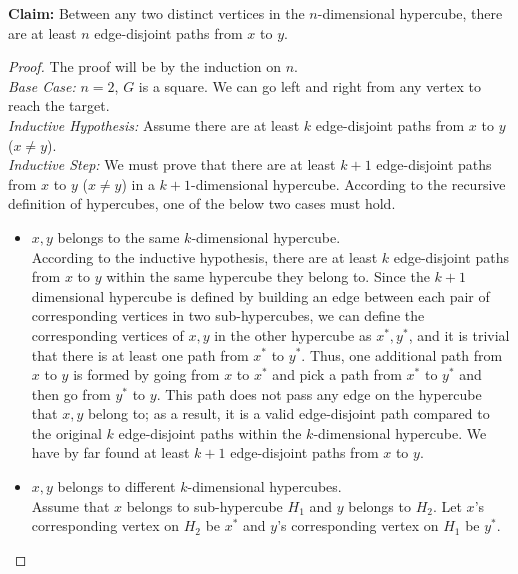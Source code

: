 \documentclass[11pt]{article}
\begin{document}
\newpage
{}

\begin{Answer}
    \textbf{Claim:} Between any two distinct vertices in the $n$-dimensional hypercube, there are at least $n$ 
    edge-disjoint paths from $x$ to $y$.
    \begin{proof}
        The proof will be by the induction on $n$. \\
        \emph{Base Case:} $n=2$, $G$ is a square. We can go left and right from any vertex to reach the target. \\
        \emph{Inductive Hypothesis:} Assume there are at least $k$ edge-disjoint paths from $x$ to $y$ ($x \neq y$). \\
        \emph{Inductive Step:} We must prove that there are at least $k+1$ edge-disjoint paths from $x$ to $y$ ($x \neq y$) 
        in a $k+1$-dimensional hypercube. According to the recursive definition of hypercubes, one of the below two cases must hold. 
        \begin{itemize}
            \item $x,y$ belongs to the same $k$-dimensional hypercube. \\
                  According to the inductive hypothesis, there are at least $k$ edge-disjoint paths from $x$ to $y$ 
                  within the same hypercube they belong to. Since the $k+1$ dimensional hypercube is defined by 
                  building an edge between each pair of corresponding vertices in two sub-hypercubes, we can define 
                  the corresponding vertices of $x,y$ in the other hypercube as $x^*,y^*$, and it is trivial that 
                  there is at least one path from $x^*$ to $y^*$. Thus, one additional path from $x$ to $y$ is formed
                  by going from $x$ to $x^*$ and pick a path from $x^*$ to $y^*$ and then go from $y^*$ to $y$. This
                  path does not pass any edge on the hypercube that $x,y$ belong to; as a result, it is a valid 
                  edge-disjoint path compared to the original $k$ edge-disjoint paths within the $k$-dimensional hypercube. 
                  We have by far found at least $k+1$ edge-disjoint paths from $x$ to $y$. 
            \item $x,y$ belongs to different $k$-dimensional hypercubes. \\
                  Assume that $x$ belongs to sub-hypercube $H_1$ and $y$ belongs to $H_2$. Let $x$'s corresponding vertex
                  on $H_2$ be $x^*$ and $y$'s corresponding vertex on $H_1$ be $y^*$. 

\end{itemize}
\end{proof}
\end{Answer}
\end{document}
